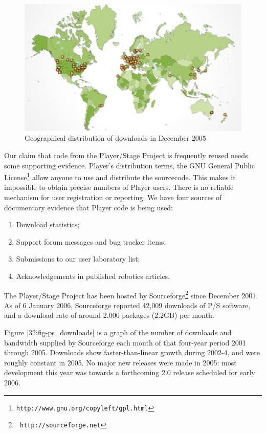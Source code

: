 \begin{figure}[top]
\begin{center}
\includegraphics[width=\columnwidth]{ps_distribution}
\caption{\label{32:fig-ps_world}Geographical distribution of downloads in December 2005}
\end{center}
\end{figure}

Our claim that code from the Player/Stage Project is frequently reused
needs some supporting evidence. Player's distribution terms, the GNU
General Public License\footnote{\tt http://www.gnu.org/copyleft/gpl.html} allow anyone to use and distribute
the sourcecode. This makes it impossible to obtain precise numbers of
Player users. There is no reliable mechanism for user registration or
reporting. We have four sources of documentary evidence that Player
code is being used:

\begin{enumerate}
\item Download statistics;
\item Support forum messages and bug tracker items; 
\item Submissions to our user laboratory list; 
\item Acknowledgements in published robotics articles.
\end{enumerate}

The Player/Stage Project has been hosted by Sourceforge\footnote{\tt
http://sourceforge.net} since December 2001. As of 6 January 2006,
Sourceforge reported 42,009 downloads of P/S software, and a download
rate of around 2,000 packages (2.2GB) per month.


Figure \ref{32:fig-ps_downloads} is a graph of the number of downloads and
bandwidth supplied by Sourceforge each month of that four-year period
2001 through 2005. Downloads show faster-than-linear growth during
2002-4, and were roughly constant in 2005. No major new releases were
made in 2005: most development this year was towards a forthcoming 2.0
release scheduled for early 2006.

